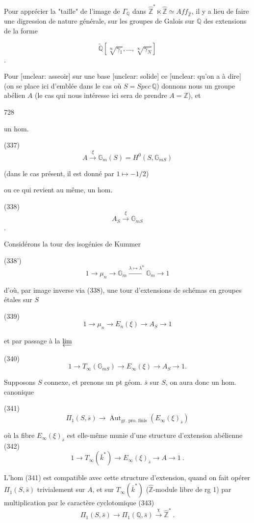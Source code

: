 Pour apprécier la "taille" de l'image de $\Gamma_{\mathbb{Q}}$ dans $\hat{\mathbb{Z}}^* \ltimes \hat{\mathbb{Z}} \simeq Aff_{\hat{\mathbb{Z}}}$, il y a lieu de faire une digression de nature générale, sur les groupes de Galois sur $\mathbb{Q}$ des extensions de la forme

$$ \tilde{\mathbb{Q}} [ \sqrt[\infty]{\gamma_1}, \dots, \sqrt[\infty]{\gamma_N} ] $$ .

Pour [unclear: asseoir] sur une base [unclear: solide] ce [unclear: qu'on a à dire] (on se place ici d'emblée dans le cas où $S = Spec \, \mathbb{Q}$) donnons nous un groupe abélien $A$ (le cas qui nous intéresse ici sera de prendre $A = \mathbb{Z}$), et

\newpage


728

un hom.

(337) $$A \xrightarrow{\xi} \mathbb{G}_m(S) = H^0(S, \mathbb{G}_{mS})$$

(dans le cas présent, il est donné par $1 \mapsto -1/2$)

ou ce qui revient au même, un hom.

(338) $$A_S \xrightarrow{\xi} \mathbb{G}_{mS}$$ .

Considérons la tour des isogénies de Kummer

(338') $$1 \to \mu_n \to \mathbb{G}_m \xrightarrow{\lambda \mapsto \lambda^n} \mathbb{G}_m \to 1$$

d'où, par image inverse via (338), une tour d'extensions de schémas en groupes étales sur $S$

(339) $$1 \to \mu_n \to E_n(\xi) \to A_S \to 1$$

et par passage à la $\varprojlim$

(340) $$1 \to T_\infty(\mathbb{G}_{mS}) \to E_\infty(\xi) \to A_S \to 1 .$$

Supposons $S$ connexe, et prenons un pt géom. $\bar{s}$ sur $S$, on aura donc un hom. canonique

(341) $$\Pi_1(S, \bar{s}) \to \operatorname{Aut}_{\text{gr. pro. finis}}(E_\infty(\xi)_{\bar{s}})$$

\newpage


où la fibre $E_{\infty}(\xi)_{\bar{s}}$ est elle-même
munie d'une structure d'extension
abélienne
(342) $$1 \to T_{\infty}(\bar{k}^*) \to E_{\infty}(\xi)_{\bar{s}} \to A \to 1 \ .$$

L'hom (341) est compatible avec cette
structure d'extension, quand on fait
opérer $\Pi_1(S, \bar{s})$ trivialement sur $A$,
et sur $T_{\infty}(\bar{k}^*)$ ($\hat{\mathbb{Z}}$-module libre de
rg 1) par multiplication par le
caractère cyclotomique
(343) $$\Pi_1(S, \bar{s}) \to \Pi_1(\mathbb{Q}, \bar{s}) \xrightarrow{\chi} \hat{\mathbb{Z}}^* \ .$$

